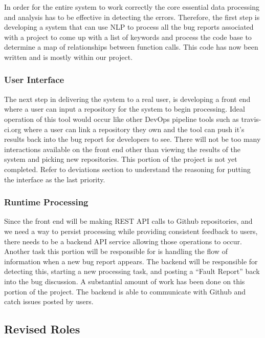 \documentclass[11pt,]{article}
\begin{document}
In order for the entire system to work correctly the core essential data
processing and analysis has to be effective in detecting the errors.
Therefore, the first step is developing a system that can use NLP to
process all the bug reports associated with a project to come up with a
list of keywords and process the code base to determine a map of
relationships between function calls. This code has now been written and
is mostly within our project.

\hypertarget{user-interface}{%
\subsubsection{User Interface}\label{user-interface}}

The next step in delivering the system to a real user, is developing a
front end where a user can input a repository for the system to begin
processing. Ideal operation of this tool would occur like other DevOps
pipeline tools such as travis-ci.org where a user can link a repository
they own and the tool can push it's results back into the bug report for
developers to see. There will not be too many interactions available on
the front end other than viewing the results of the system and picking
new repositories. This portion of the project is not yet completed.
Refer to deviations section to understand the reasoning for putting the
interface as the last priority.

\hypertarget{runtime-processing}{%
\subsubsection{Runtime Processing}\label{runtime-processing}}

Since the front end will be making REST API calls to Github
repositories, and we need a way to persist processing while providing
consistent feedback to users, there needs to be a backend API service
allowing those operations to occur. Another task this portion will be
responsible for is handling the flow of information when a new bug
report appears. The backend will be responsible for detecting this,
starting a new processing task, and posting a ``Fault Report'' back into
the bug discussion. A substantial amount of work has been done on this
portion of the project. The backend is able to communicate with Github
and catch issues posted by users.

\hypertarget{revised-roles}{%
\subsection{Revised Roles}\label{revised-roles}}
\end{document}
